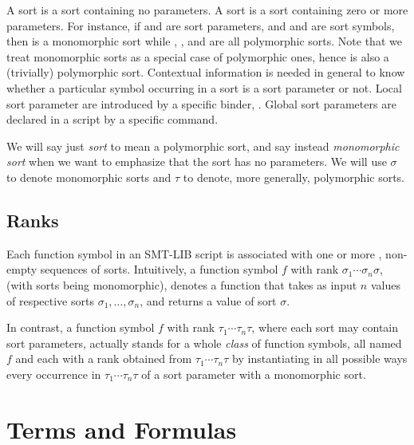 \begin{newver}
A  sort is a sort containing no parameters.
A  sort is a sort containing zero or more parameters.
For instance, if  and  are sort parameters,
and  and  are sort symbols, 
then  is a monomorphic sort 
while , , and  are
all polymorphic sorts.
Note that we treat monomorphic sorts as a special case of polymorphic ones,
hence  is also a (trivially) polymorphic sort.
Contextual information is needed in general to know whether a particular symbol
occurring in a sort is a sort parameter or not.
Local sort parameter are introduced by a specific binder, .
Global sort parameters are declared in a script by a specific command.

We will say just \emph{sort} to mean a polymorphic sort, and 
say instead \emph{monomorphic sort} when we want to emphasize 
that the sort has no parameters. 
We will use $\sigma$ to denote monomorphic sorts and 
$\tau$ to denote, more generally, polymorphic sorts.
\end{newver}

\subsection{Ranks}

Each function symbol in an SMT-LIB script is associated with one or more 
, non-empty sequences of sorts.
Intuitively, a function symbol $f$ with rank $\sigma_1\cdots\sigma_n\sigma$,
(with sorts being monomorphic),
denotes a function that takes as input $n$ values of respective sorts
$\sigma_1, \ldots, \sigma_n$,
and returns a value of sort $\sigma$.

In contrast, a function symbol $f$ with rank $\tau_1\cdots\tau_n\tau$,
where each sort may contain sort parameters,
actually stands for a whole \emph{class} of function symbols, 
all named $f$ and each with a rank obtained from $\tau_1\cdots\tau_n\tau$ 
by instantiating in all possible ways every occurrence in $\tau_1\cdots\tau_n\tau$
of a sort parameter with a monomorphic sort.


\section{Terms and Formulas} \label{sec:concrete-terms}

